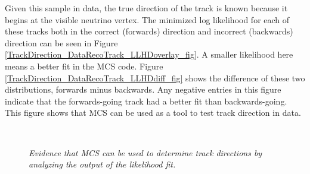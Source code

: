 Given this sample in {\ub} data, the true direction of the track is known because it begins at the visible neutrino vertex. The minimized log likelihood for each of these tracks both in the correct (forwards) direction and incorrect (backwards) direction can be seen in Figure \ref{TrackDirection_DataRecoTrack_LLHDoverlay_fig}. A smaller likelihood here means a better fit in the MCS code. Figure \ref{TrackDirection_DataRecoTrack_LLHDdiff_fig} shows the difference of these two distributions, forwards minus backwards. Any negative entries in this figure indicate that the forwards-going track had a better fit than backwards-going. This figure shows that MCS can be used as a tool to test track direction in {\ub} data.

\begin{figure}
\centering
\mbox{
	\quad
	}
\caption{\textit{Evidence that MCS can be used to determine track directions by analyzing the output of the likelihood fit.}}
\end{figure}